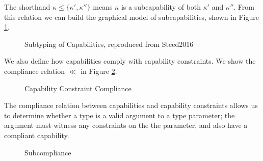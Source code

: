 The shorthand $\kappa \leqslant \{ \kappa', \kappa'' \}$ means $\kappa$ is a subcapability of both $\kappa'$ and $\kappa''$. From this relation we can build the graphical model of subcapabilities, shown in Figure \ref{fig:degen-subcap-d}. \\

\begin{figure}[H]
    \centering
    
    \caption{Subtyping of Capabilities, reproduced from Steed2016}
    \label{fig:degen-subcap-d}
\end{figure}

We also define how capabilities comply with capability constraints. We show the compliance relation $\ll$ in Figure \ref{fig:degen-comp}.

\begin{figure}[H]
    \centering
    \caption{Capability Constraint Compliance}
    \label{fig:degen-comp}
\end{figure}

The compliance relation between capabilities and capability constraints allows us to determine whether a type is a valid argument to a type parameter; the argument must witness any constraints on the the parameter, and also have a compliant capability.

\begin{figure}[H]
    \centering
    \caption{Subcompliance}
    \label{fig:degen-subcomp}
\end{figure}


